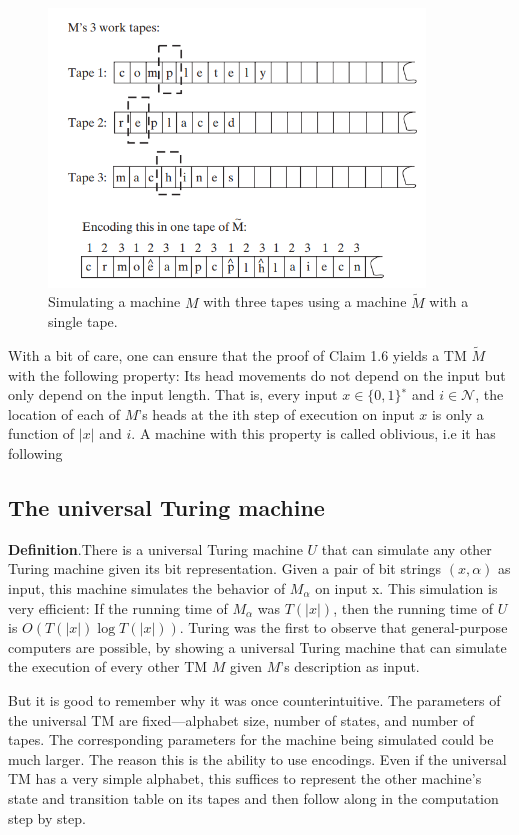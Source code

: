 \documentclass[a4paper]{article}
\begin{document}
\begin{figure}[!ht]
\centering
\includegraphics[width=10cm]{s2.png}
\caption{Simulating a machine $M$ with three tapes using a machine $\widetilde{M}$ with a single tape.}
\label{fig:scetch2}
\end{figure}

With a bit of care, one can ensure that the proof of Claim 1.6 yields a TM $\widetilde{M}$ with the following property: Its head movements do not depend on the input but only depend on
the input length. That is, every input $x \in \{0, 1\}^{∗}$ and $i \in \mathcal{N}$, the location of each of $M$’s
heads at the ith step of execution on input $x$ is only a function of $|x|$ and $i$. A machine
with this property is called oblivious, i.e it has following 

\subsection{The universal Turing machine}
\textbf{Definition}.There is a universal Turing machine $U$ that can simulate any other Turing machine given
its bit representation. Given a pair of bit strings $(x, \alpha)$ as input, this machine simulates
the behavior of $M_\alpha$ on input x. This simulation is very efficient: If the running time of
$M_\alpha$ was $T(|x|)$, then the running time of $U$ is $O(T(|x|) \log{T(|x|)})$.
Turing was the first to observe that general-purpose computers are possible, by showing
a universal Turing machine that can simulate the execution of every other TM $M$ given
$M$’s description as input.

But it is
good to remember why it was once counterintuitive. The parameters of the universal
TM are fixed—alphabet size, number of states, and number of tapes. The corresponding
parameters for the machine being simulated could be much larger. The reason this is the ability to use encodings. Even if the universal TM has a
very simple alphabet, this suffices to represent the other machine’s state and transition
table on its tapes and then follow along in the computation step by step.
\end{document}
